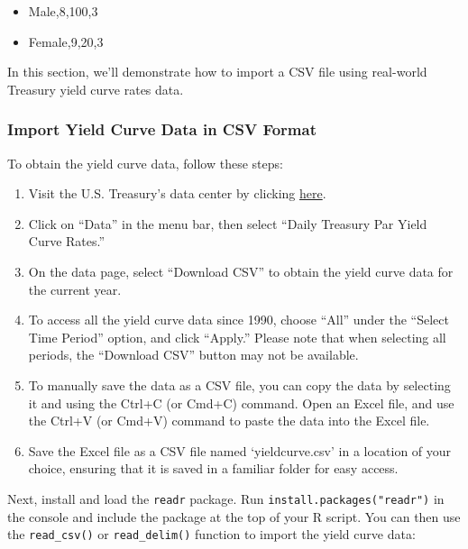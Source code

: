 \documentclass[
]{book}
\providecommand{\tightlist}{%
  \setlength{\itemsep}{0pt}\setlength{\parskip}{0pt}}
\begin{document}
\begin{itemize}
\tightlist
\item
  Male,8,100,3
\item
  Female,9,20,3
\end{itemize}

In this section, we'll demonstrate how to import a CSV file using real-world Treasury yield curve rates data.

\hypertarget{import-yield-curve-data-in-csv-format-1}{%
\subsubsection*{Import Yield Curve Data in CSV Format}\label{import-yield-curve-data-in-csv-format-1}}

To obtain the yield curve data, follow these steps:

\begin{enumerate}
\def\labelenumi{\arabic{enumi}.}
\tightlist
\item
  Visit the U.S. Treasury's data center by clicking \href{https://www.treasury.gov/resource-center/data-chart-center}{here}.
\item
  Click on ``Data'' in the menu bar, then select ``Daily Treasury Par Yield Curve Rates.''
\item
  On the data page, select ``Download CSV'' to obtain the yield curve data for the current year.
\item
  To access all the yield curve data since 1990, choose ``All'' under the ``Select Time Period'' option, and click ``Apply.'' Please note that when selecting all periods, the ``Download CSV'' button may not be available.
\item
  To manually save the data as a CSV file, you can copy the data by selecting it and using the Ctrl+C (or Cmd+C) command. Open an Excel file, and use the Ctrl+V (or Cmd+V) command to paste the data into the Excel file.
\item
  Save the Excel file as a CSV file named `yieldcurve.csv' in a location of your choice, ensuring that it is saved in a familiar folder for easy access.
\end{enumerate}

Next, install and load the \texttt{readr} package. Run \texttt{install.packages("readr")} in the console and include the package at the top of your R script. You can then use the \texttt{read\_csv()} or \texttt{read\_delim()} function to import the yield curve data:
\end{document}
